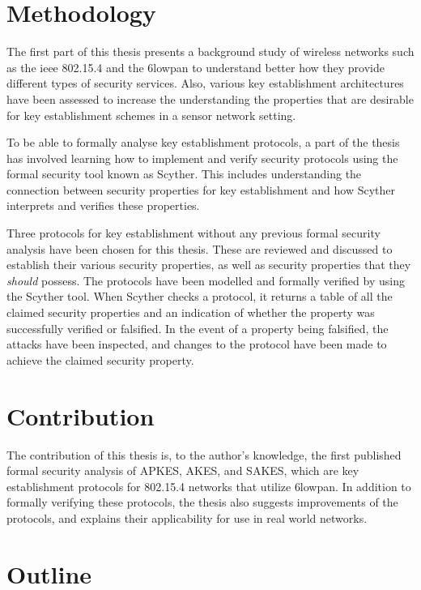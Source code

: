 \section{Methodology}

The first part of this thesis presents a background study of wireless networks such as the \gls{ieee} 802.15.4 and the \gls{6lowpan} to understand better how they provide different types of security services. Also, various key establishment architectures have been assessed to increase the understanding the properties that are desirable for key establishment schemes in a sensor network setting.

To be able to formally analyse key establishment protocols, a part of the thesis has involved learning how to implement and verify security protocols using the formal security tool known as Scyther. This includes understanding the connection between security properties for key establishment and how Scyther interprets and verifies these properties.

Three protocols for key establishment without any previous formal security analysis have been chosen for this thesis. These are reviewed and discussed to establish their various security properties, as well as security properties that they \textit{should} possess. The protocols have been modelled and formally verified by using the Scyther tool. When Scyther checks a protocol, it returns a table of all the claimed security properties and an indication of whether the property was successfully verified or falsified. In the event of a property being falsified, the attacks have been inspected, and changes to the protocol have been made to achieve the claimed security property. 

\section{Contribution}

The contribution of this thesis is, to the author's knowledge, the first published formal security analysis of APKES, AKES, and SAKES, which are key establishment protocols for 802.15.4 networks that utilize \gls{6lowpan}. In addition to formally verifying these protocols, the thesis also suggests improvements of the protocols, and explains their applicability for use in real world networks.


\section{Outline}


